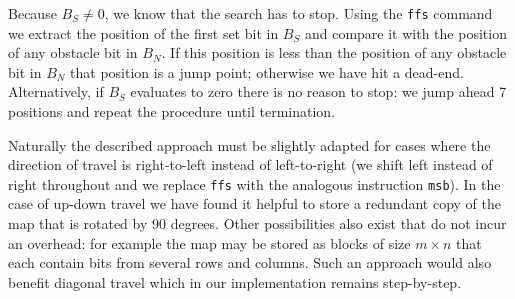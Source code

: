 Because $B_S \neq 0$, we know that the search has to stop.  Using the
\texttt{ffs} command we extract the position of the first set bit in $B_S$ and
compare it with the position of any obstacle bit in $B_N$.  If this position
is less than the position of any obstacle bit in $B_N$ that position is a jump point;
otherwise we have hit a dead-end.  Alternatively, if $B_S$ evaluates to zero
there is no reason to stop: we jump ahead 7 positions and repeat the procedure
until termination.

Naturally the described approach must be slightly adapted for cases
where the direction of travel is right-to-left instead of left-to-right (we
shift left instead of right throughout and we replace \texttt{ffs} with the
analogous instruction \texttt{msb}). In the case of up-down travel we have
found it helpful to store a redundant copy of the map that is rotated by 90
degrees. Other possibilities also exist that do not incur an overhead: for
example the map may be stored as blocks of size $m \times n$ that each contain
bits from several rows and columns. Such an approach would also benefit
diagonal travel which in our implementation remains step-by-step.


%
%
%
%
%

